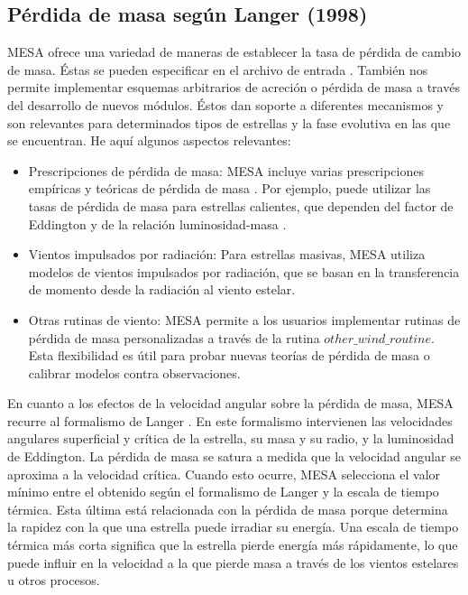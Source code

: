 \subsection{Pérdida de masa según Langer (1998)}
MESA ofrece una variedad de maneras de establecer la tasa de pérdida de cambio de masa. Éstas se pueden especificar en el archivo de entrada \cite{Paxton2010}. También nos permite implementar esquemas arbitrarios de acreción o pérdida de masa a través del desarrollo de nuevos módulos. Éstos dan soporte a diferentes mecanismos y son relevantes para determinados tipos de estrellas y la fase evolutiva en las que se encuentran. He aquí algunos aspectos relevantes:
\begin{itemize}
    \item Prescripciones de pérdida de masa: MESA incluye varias prescripciones empíricas y teóricas de pérdida de masa \cite{Vink2023}. Por ejemplo, puede utilizar las tasas de pérdida de masa para estrellas calientes, que dependen del factor de Eddington y de la relación luminosidad-masa \cite{Gautham2022}.
    \item Vientos impulsados por radiación: Para estrellas masivas, MESA utiliza modelos de vientos impulsados por radiación, que se basan en la transferencia de momento desde la radiación al viento estelar.
    \item Otras rutinas de viento: MESA permite a los usuarios implementar rutinas de pérdida de masa personalizadas a través de la rutina $other\_wind\_routine$. Esta flexibilidad es útil para probar nuevas teorías de pérdida de masa o calibrar modelos contra observaciones.
\end{itemize}

En cuanto a los efectos de la velocidad angular sobre la pérdida de masa, MESA recurre al formalismo de Langer \citep{Langer1998, Paxton2013}. En este formalismo intervienen las velocidades angulares superficial y crítica de la estrella, su masa y su radio, y la luminosidad de Eddington. La pérdida de masa se satura a medida que la velocidad angular se aproxima a la velocidad crítica. Cuando esto ocurre, MESA selecciona el valor mínimo entre el obtenido según el formalismo de Langer y la escala de tiempo térmica. Esta última está relacionada con la pérdida de masa porque determina la rapidez con la que una estrella puede irradiar su energía. Una escala de tiempo térmica más corta significa que la estrella pierde energía más rápidamente, lo que puede influir en la velocidad a la que pierde masa a través de los vientos estelares u otros procesos.\par

